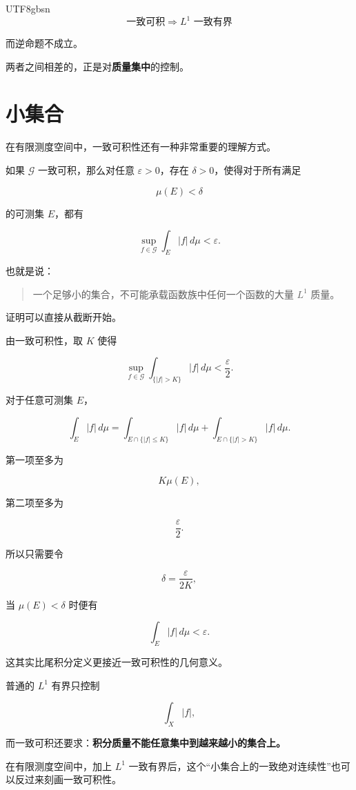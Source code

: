 \documentclass[11pt]{article}
\begin{document}
\begin{CJK*}{UTF8}{gbsn}
\[
\boxed{
\text{一致可积}
\Longrightarrow
L^1\text{ 一致有界}
}
\]

而逆命题不成立。

两者之间相差的，正是对\textbf{质量集中}的控制。


\section{小集合}


在有限测度空间中，一致可积性还有一种非常重要的理解方式。

如果 $\mathcal G$ 一致可积，那么对任意 $\varepsilon>0$，存在 $\delta>0$，使得对于所有满足

\[
\mu(E)<\delta
\]

的可测集 $E$，都有

\[
\sup_{f\in\mathcal G}
\int_E|f|\,d\mu
<
\varepsilon.
\]

也就是说：

\begin{quote}
一个足够小的集合，不可能承载函数族中任何一个函数的大量 $L^1$ 质量。
\end{quote}


证明可以直接从截断开始。

由一致可积性，取 $K$ 使得

\[
\sup_{f\in\mathcal G}
\int_{\{|f|>K\}}|f|\,d\mu
<
\frac{\varepsilon}{2}.
\]

对于任意可测集 $E$，

\[
\int_E|f|\,d\mu
=
\int_{E\cap\{|f|\leq K\}}|f|\,d\mu
+
\int_{E\cap\{|f|>K\}}|f|\,d\mu.
\]

第一项至多为

\[
K\mu(E),
\]

第二项至多为

\[
\frac{\varepsilon}{2}.
\]

所以只需要令

\[
\delta=\frac{\varepsilon}{2K},
\]

当 $\mu(E)<\delta$ 时便有

\[
\int_E|f|\,d\mu<\varepsilon.
\]

这其实比尾积分定义更接近一致可积性的几何意义。

普通的 $L^1$ 有界只控制

\[
\int_X|f|,
\]

而一致可积还要求：\textbf{积分质量不能任意集中到越来越小的集合上。}

在有限测度空间中，加上 $L^1$ 一致有界后，这个“小集合上的一致绝对连续性”也可以反过来刻画一致可积性。



\end{CJK*}
\end{document}
